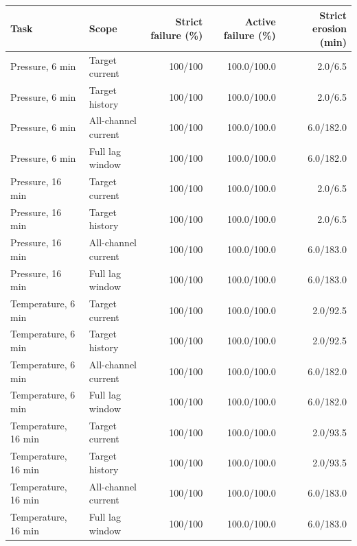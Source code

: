 \begin{tabular}{@{}llrrr@{}}
\toprule
Task & Scope & Strict failure (\%) & Active failure (\%) & Strict erosion (min) \\
\midrule
Pressure, 6 min & Target current & 100/100 & 100.0/100.0 & 2.0/6.5 \\
Pressure, 6 min & Target history & 100/100 & 100.0/100.0 & 2.0/6.5 \\
Pressure, 6 min & All-channel current & 100/100 & 100.0/100.0 & 6.0/182.0 \\
Pressure, 6 min & Full lag window & 100/100 & 100.0/100.0 & 6.0/182.0 \\
Pressure, 16 min & Target current & 100/100 & 100.0/100.0 & 2.0/6.5 \\
Pressure, 16 min & Target history & 100/100 & 100.0/100.0 & 2.0/6.5 \\
Pressure, 16 min & All-channel current & 100/100 & 100.0/100.0 & 6.0/183.0 \\
Pressure, 16 min & Full lag window & 100/100 & 100.0/100.0 & 6.0/183.0 \\
Temperature, 6 min & Target current & 100/100 & 100.0/100.0 & 2.0/92.5 \\
Temperature, 6 min & Target history & 100/100 & 100.0/100.0 & 2.0/92.5 \\
Temperature, 6 min & All-channel current & 100/100 & 100.0/100.0 & 6.0/182.0 \\
Temperature, 6 min & Full lag window & 100/100 & 100.0/100.0 & 6.0/182.0 \\
Temperature, 16 min & Target current & 100/100 & 100.0/100.0 & 2.0/93.5 \\
Temperature, 16 min & Target history & 100/100 & 100.0/100.0 & 2.0/93.5 \\
Temperature, 16 min & All-channel current & 100/100 & 100.0/100.0 & 6.0/183.0 \\
Temperature, 16 min & Full lag window & 100/100 & 100.0/100.0 & 6.0/183.0 \\
\bottomrule
\end{tabular}
